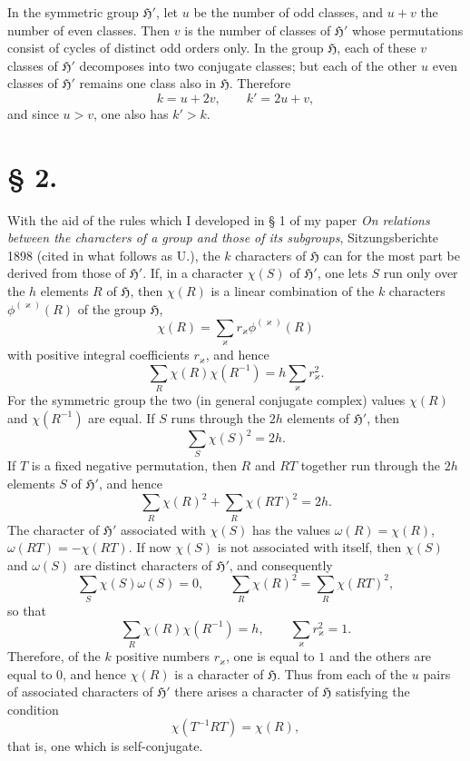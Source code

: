 \documentclass[11pt]{article}
\newcommand{\Hgr}{\mathfrak{H}}
\begin{document}
In the symmetric group $\Hgr'$, let $u$ be the number of odd classes, and $u+v$ the number of even classes. Then $v$ is the number of classes of $\Hgr'$ whose permutations consist of cycles of distinct odd orders only. In the group $\Hgr$, each of these $v$ classes of $\Hgr'$ decomposes into two conjugate classes; but each of the other $u$ even classes of $\Hgr'$ remains one class also in $\Hgr$. Therefore
\begin{equation}\tag{3.}
 k=u+2v,	\qquad k'=2u+v,
\end{equation}
and since $u>v$, one also has $k'>k$.

\section*{§ 2.}

With the aid of the rules which I developed in § 1 of my paper \emph{On relations between the characters of a group and those of its subgroups}, Sitzungsberichte 1898 (cited in what follows as U.), the $k$ characters of $\Hgr$ can for the most part be derived from those of $\Hgr'$. If, in a character $\chi(S)$ of $\Hgr'$, one lets $S$ run only over the $h$ elements $R$ of $\Hgr$, then $\chi(R)$ is a linear combination of the $k$ characters $\phi^{(\varkappa)}(R)$ of the group $\Hgr$,
\[
 \chi(R)=\sum_{\varkappa} r_\varkappa\phi^{(\varkappa)}(R)
\]
with positive integral coefficients $r_\varkappa$, and hence
\[
 \sum_R \chi(R)\chi(R^{-1})=h\sum_\varkappa r_\varkappa^2.
\]
For the symmetric group the two (in general conjugate complex) values $\chi(R)$ and $\chi(R^{-1})$ are equal. If $S$ runs through the $2h$ elements of $\Hgr'$, then
\[
 \sum_S \chi(S)^2=2h.
\]
If $T$ is a fixed negative permutation, then $R$ and $RT$ together run through the $2h$ elements $S$ of $\Hgr'$, and hence
\[
 \sum_R \chi(R)^2+\sum_R \chi(RT)^2=2h.
\]
The character of $\Hgr'$ associated with $\chi(S)$ has the values $\omega(R)=\chi(R)$, $\omega(RT)=-\chi(RT)$. If now $\chi(S)$ is not associated with itself, then $\chi(S)$ and $\omega(S)$ are distinct characters of $\Hgr'$, and consequently
\[
 \sum_S \chi(S)\omega(S)=0,\qquad \sum_R \chi(R)^2=\sum_R\chi(RT)^2,
\]
so that
\[
 \sum_R\chi(R)\chi(R^{-1})=h,	\qquad \sum_\varkappa r_\varkappa^2=1.
\]
Therefore, of the $k$ positive numbers $r_\varkappa$, one is equal to $1$ and the others are equal to $0$, and hence $\chi(R)$ is a character of $\Hgr$. Thus from each of the $u$ pairs of associated characters of $\Hgr'$ there arises a character of $\Hgr$ satisfying the condition
\begin{equation}\tag{1.}
 \chi(T^{-1}RT)=\chi(R),
\end{equation}
that is, one which is self-conjugate.
\end{document}

